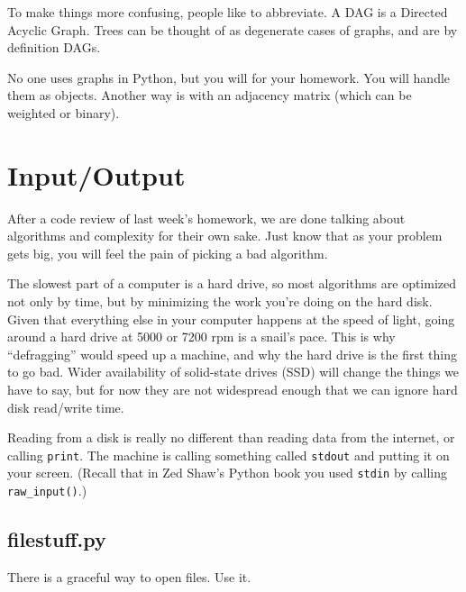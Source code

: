 \documentclass[12pt,letter]{article}
\begin{document}
To make things more confusing, people like to abbreviate. A DAG is a
Directed Acyclic Graph. Trees can be thought of as degenerate cases of
graphs, and are by definition DAGs.

No one uses graphs in Python, but you will for
your homework. You will handle them as objects. Another way is with an adjacency matrix (which can be
weighted or binary). 


\section{Input/Output}





After a code review of last week's homework, we are done talking about
algorithms and complexity for their own sake. Just know that as your
problem gets big, you will feel the pain of picking a bad algorithm. 

The slowest part of a computer is a hard drive, so most algorithms are
optimized not only by time, but by minimizing the work you're doing on
the hard disk. Given that everything else in your computer happens at
the speed of light, going around a hard drive at 5000 or 7200 rpm is a
snail's pace. This is why ``defragging'' would speed up a machine, and
why the hard drive is the first thing to go bad. Wider availability of
solid-state drives (SSD) will change the things we have to say, but
for now they are not widespread enough that we can ignore hard disk
read/write time. 


Reading from a disk is really no different than reading data from the
internet, or calling \texttt{print}. The machine is calling something
called \texttt{stdout} and putting it on your screen. (Recall that in
Zed Shaw's Python book you used \texttt{stdin} by calling
\texttt{raw\_input()}.)

\subsection{filestuff.py}
There is a graceful way to open files. Use it. 
\end{document}
